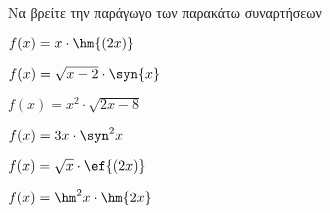 Να βρείτε την παράγωγο των παρακάτω συναρτήσεων
\begin{multicols}{2}
\begin{alist}
\item $ f(x)=x\cdot\hm{(2x)} $
\item $ f(x)=\sqrt{x-2}\cdot\syn{x} $
\item $ f(x)=x^2\cdot\sqrt{2x-8} $
\item $ f(x)=3x\cdot\syn^2{x} $
\item $ f(x)=\sqrt{x}\cdot\ef{(2x)} $
\item $ f(x)=\hm^2{x}\cdot\hm{2x} $
\end{alist}
\end{multicols}
